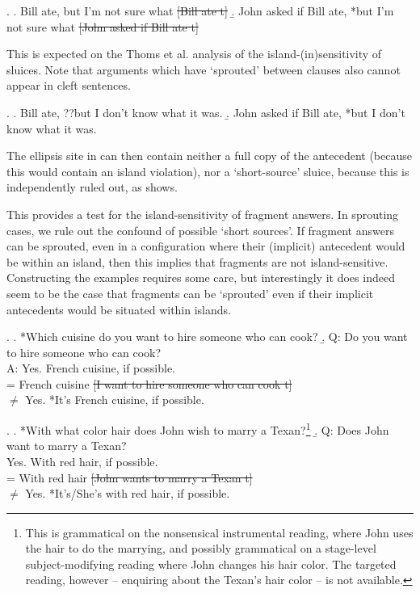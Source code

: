 \documentclass[11pt,letterpaper]{article}
\newcommand{\el}[1]{\sout{#1}}
\begin{document}
\ex. 	\a. Bill ate, but I'm not sure what \el{[Bill ate t]}
	\b. John asked if Bill ate, *but I'm not sure what \el{[John asked if Bill ate t]}
	
This is expected on the Thoms et al. %
analysis of the island-(in)sensitivity of sluices. Note that arguments which have `sprouted' between clauses also cannot appear in cleft sentences.

\ex. 	\a. Bill ate, ??but I don't know what it was.
	\b. John asked if Bill ate, *but I don't know what it was.

The ellipsis site in \LLast[b] can then contain neither a full copy of the antecedent (because this would contain an island violation), nor a `short-source' sluice, because this is independently ruled out, as \Last[b] shows.

This provides a test for the island-sensitivity of fragment answers. In sprouting cases, we rule out the confound of possible `short sources'. If fragment answers can be sprouted, even in a configuration where their (implicit) antecedent would be within an island, then this implies that fragments are not island-sensitive. Constructing the examples requires some care, but interestingly it does indeed seem to be the case that fragments can be `sprouted' even if their implicit antecedents would be situated within islands.

\ex. 	\a. *Which cuisine do you want to hire someone who can cook?
	\b. Q: Do you want to hire someone who can cook?\\
  	A: Yes. French cuisine, if possible.\\
  	= French cuisine \el{[I want to hire someone who can cook t]}\\
  	$\neq$ Yes. *It's French cuisine, if possible.
  	
 \ex. 	\a. *With what color hair does John wish to marry a Texan?\footnote{This is grammatical on the nonsensical instrumental reading, where John uses the hair to do the marrying, and possibly grammatical on a stage-level subject-modifying reading where John changes his hair color. The targeted reading, however -- enquiring about the Texan's hair color -- is not available.}
	\b. Q: Does John want to marry a Texan?\\
		Yes. With red hair, if possible.\\
		= With red hair \el{[John wants to marry a Texan t]}\\
		$\neq$ Yes. *It's/She's with red hair, if possible.
		
\end{document}
